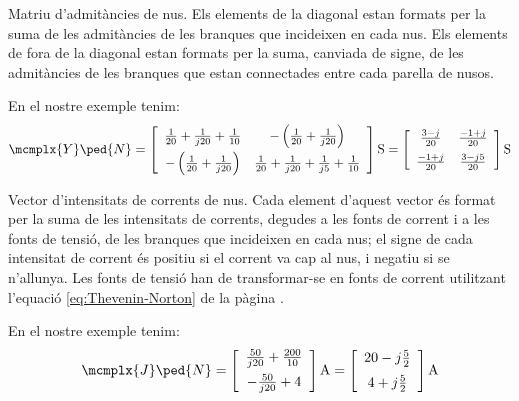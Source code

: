 \begin{list}{}
   {\setlength{\labelwidth}{20mm} \setlength{\leftmargin}{22mm} \setlength{\labelsep}{2mm}}

   \item[$\mcmplx{Y}\ped{N}\{n \times n\}$] Matriu d'admitàncies de nus. Els elements de la diagonal estan formats per la suma de les admitàncies de les branques que incideixen en cada nus.
   Els elements de fora de la diagonal estan formats per la suma, canviada de signe, de les admitàncies de les branques que estan connectades entre cada parella de nusos.

   En el nostre exemple tenim:
   \[
      \mcmplx{Y}\ped{N} =
      \begin{bmatrix}\begin{array}{cc}
            \frac{1}{20} + \frac{1}{j 20} +  \frac{1}{10} &
            -\left(\frac{1}{20} + \frac{1}{j 20}\right) \\[2mm]
            -\left(\frac{1}{20} + \frac{1}{j 20}\right)  &
            \frac{1}{20} + \frac{1}{j 20} +  \frac{1}{j 5} + \frac{1}{10}
      \end{array}\end{bmatrix}\unit{S} =
      \begin{bmatrix}\begin{array}{cc}
            \frac{3 - j}{20}  & \frac{-1 + j}{20} \\[2mm]
            \frac{-1 + j}{20} & \frac{3 - j 5}{20}
      \end{array}\end{bmatrix}\unit{S}
   \]

   \item[$\mcmplx{J}\ped{N}\{n\}$] Vector
d'intensitats de corrents de nus. Cada element d'aquest vector és format per la suma de
les intensitats de corrents, degudes a les fonts de corrent i a les fonts de tensió, de les
branques que incideixen en cada nus; el signe de cada intensitat de corrent és positiu si el
corrent va cap al nus, i negatiu si se n'allunya. Les fonts de tensió han de
transformar-se en fonts de corrent utilitzant l'equació \eqref{eq:Thevenin-Norton} de
la pàgina \pageref{eq:Thevenin-Norton}.

   En el nostre exemple tenim:
   \[
      \mcmplx{J}\ped{N} =
      \begin{bmatrix}\begin{array}{c}
            \frac{50}{j 20} +  \frac{200}{10} \\[2mm]
            - \frac{50}{j 20} + 4
      \end{array}\end{bmatrix}\unit{A} =
      \begin{bmatrix}\begin{array}{c}
            20 - j \frac{5}{2} \\[2mm]
            4 + j \frac{5}{2}
      \end{array}\end{bmatrix}\unit{A}
   \]

\end{list}


